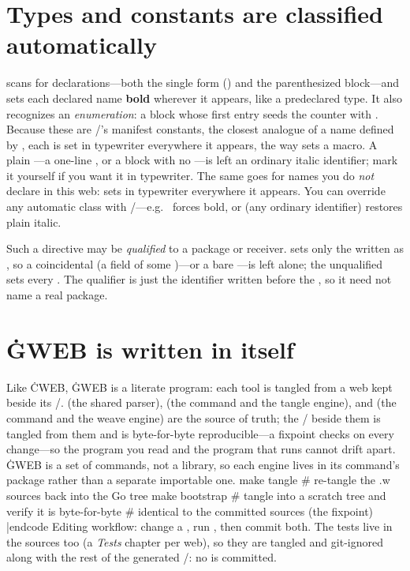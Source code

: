 \section{Types and constants are classified automatically}
 scans for  declarations---both the single form () and the parenthesized block---and sets each declared name {\bf bold}
wherever it appears, like a predeclared type. It also recognizes an 
{\it enumeration}: a  block whose first entry seeds the counter
with . Because these are \GO/'s manifest constants, the closest analogue of
a name defined by , each is set in typewriter everywhere it appears, the
way  sets a  macro. A plain ---a one-line , or a block with no ---is left an ordinary italic
identifier; mark it  yourself if you want it in typewriter. The same goes
for names you do {\it not\/} declare in this web:  sets
 in typewriter everywhere it appears. You can override any automatic
class with /---e.g.\  forces  bold, or
 (any ordinary identifier) restores plain italic.

Such a directive may be {\it qualified\/} to a package or receiver.  sets only the  written as , so a coincidental
 (a  field of some )---or a bare ---is
left alone; the unqualified  sets every . The qualifier is
just the identifier written before the , so it need not name a real
package.

\section{\.{GWEB} is written in itself}
Like \.{CWEB}, \.{GWEB} is a literate program: each tool is tangled from a  web
kept beside its \GO/.  (the shared parser),
 (the command and the tangle engine), and
 (the command and the weave engine) are the source of
truth; the \GO/ beside them is tangled from them and is byte-for-byte
reproducible---a fixpoint  checks on every change---so the
program you read and the program that runs cannot drift apart. \.{GWEB} is a set
of commands, not a library, so each engine lives in its command's 
package rather than a separate importable one.
\begincode
make tangle       # re-tangle the .w sources back into the Go tree
make bootstrap    # tangle into a scratch tree and verify it is byte-for-byte
                  # identical to the committed sources (the fixpoint)
|endcode
\noindent Editing workflow: change a , run , then commit
both. The tests live in the  sources too (a {\it Tests\/} chapter per
web), so they are tangled and git-ignored along with the rest of the generated
\GO/: no  is committed.

